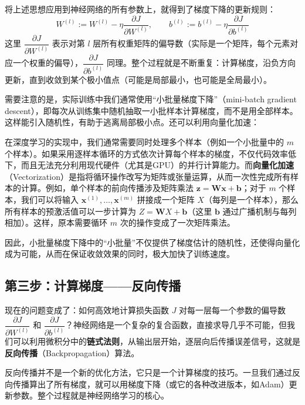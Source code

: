 \documentclass[lang=cn,zihao=-4,a4paper,fontset=windows]{beautybook}
\renewcommand{\partial}{∂}
\begin{document}
将上述思想应用到神经网络的所有参数上，就得到了梯度下降的更新规则：
\[W^{(l)} := W^{(l)} - \eta \frac{\partial J}{\partial W^{(l)}}, \qquad b^{(l)} := b^{(l)} - \eta \frac{\partial J}{\partial b^{(l)}}\]
这里 $\dfrac{\partial J}{\partial W^{(l)}}$ 表示对第 $l$ 层所有权重矩阵的偏导数（实际是一个矩阵，每个元素对应一个权重的偏导），$\dfrac{\partial J}{\partial b^{(l)}}$ 同理。整个过程就是不断重复：计算梯度，沿负方向更新，直到收敛到某个极小值点（可能是局部最小，也可能是全局最小）。

需要注意的是，实际训练中我们通常使用“小批量梯度下降”（mini-batch gradient descent），即每次从训练集中随机抽取一小批样本计算梯度，而不是用全部样本。这样能引入随机性，有助于逃离局部极小点。还可以利用向量化加速：

\begin{definition}[][向量化加速]
在深度学习的实现中，我们通常需要同时处理多个样本（例如一个小批量中的 $m$ 个样本）。如果采用逐样本循环的方式依次计算每个样本的梯度，不仅代码效率低下，而且无法充分利用现代硬件（尤其是GPU）的并行计算能力。而\textbf{向量化加速}（Vectorization）是指将循环操作改写为矩阵或张量运算，从而一次性完成所有样本的计算。例如，单个样本的前向传播涉及矩阵乘法 $\mathbf{z} = \mathbf{W}\mathbf{x} + \mathbf{b}$；对于 $m$ 个样本，我们可以将输入 $\mathbf{x}^{(1)}, \dots, \mathbf{x}^{(m)}$ 拼接成一个矩阵 $X$（每列是一个样本），那么所有样本的预激活值可以一步计算为 $Z = \mathbf{W}X + \mathbf{b}$（这里 $\mathbf{b}$ 通过广播机制与每列相加）。这样，原本需要循环 $m$ 次的操作变成了一次矩阵乘法。
\end{definition}

因此，小批量梯度下降中的“小批量”不仅提供了梯度估计的随机性，还使得向量化成为可能，从而在保证收敛效果的同时，极大加快了训练速度。

\subsection{第三步：计算梯度——反向传播}

现在的问题变成了：如何高效地计算损失函数 $J$ 对每一层每一个参数的偏导数 $\dfrac{\partial J}{\partial W^{(l)}}$ 和 $\dfrac{\partial J}{\partial b^{(l)}}$？神经网络是一个复杂的复合函数，直接求导几乎不可能，但我们可以利用微积分中的\textbf{链式法则}，从输出层开始，逐层向后传播误差信号，这就是\textbf{反向传播}（Backpropagation）算法。

反向传播并不是一个新的优化方法，它只是一个计算梯度的技巧。一旦我们通过反向传播算出了所有梯度，就可以用梯度下降（或它的各种改进版本，如Adam）更新参数。整个过程就是神经网络学习的核心。
\end{document}

